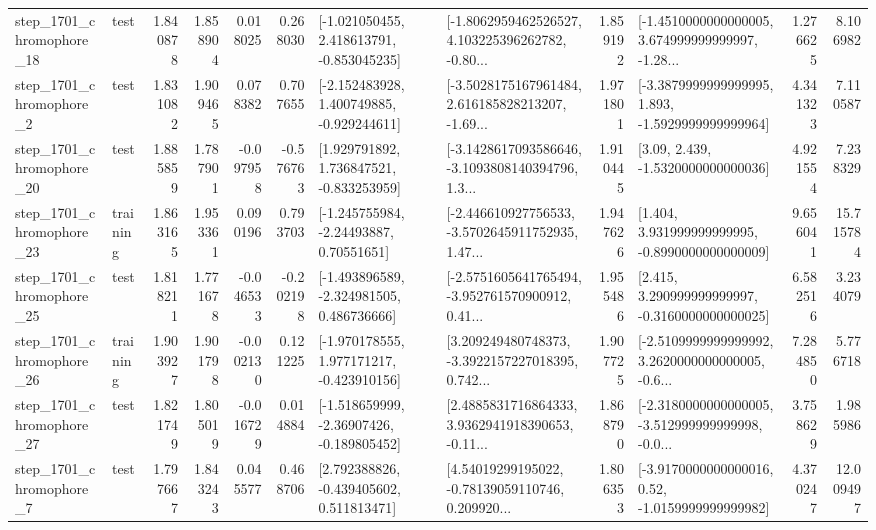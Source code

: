 \begin{tabular}{llrrrrllrlrr}
 step\_1701\_chromophore\_18 &      test &      1.840878 &    1.858904 &      0.018025 &  0.268030 &   [-1.021050455, 2.418613791, -0.853045235] &  [-1.8062959462526527, 4.103225396262782, -0.80... &       1.859192 &  [-1.4510000000000005, 3.674999999999997, -1.28... &            1.276625 &          8.106982 \\
  step\_1701\_chromophore\_2 &      test &      1.831082 &    1.909465 &      0.078382 &  0.707655 &   [-2.152483928, 1.400749885, -0.929244611] &  [-3.5028175167961484, 2.616185828213207, -1.69... &       1.971801 &  [-3.3879999999999995, 1.893, -1.5929999999999964] &            4.341323 &          7.110587 \\
 step\_1701\_chromophore\_20 &      test &      1.885859 &    1.787901 &     -0.097958 & -0.576763 &    [1.929791892, 1.736847521, -0.833253959] &  [-3.1428617093586646, -3.1093808140394796, 1.3... &       1.910445 &                 [3.09, 2.439, -1.5320000000000036] &            4.921554 &          7.238329 \\
 step\_1701\_chromophore\_23 &  training &      1.863165 &    1.953361 &      0.090196 &  0.793703 &     [-1.245755984, -2.24493887, 0.70551651] &  [-2.446610927756533, -3.5702645911752935, 1.47... &       1.947626 &    [1.404, 3.931999999999995, -0.8990000000000009] &            9.656041 &         15.715784 \\
 step\_1701\_chromophore\_25 &      test &      1.818211 &    1.771678 &     -0.046533 & -0.202198 &   [-1.493896589, -2.324981505, 0.486736666] &  [-2.5751605641765494, -3.952761570900912, 0.41... &       1.955486 &    [2.415, 3.290999999999997, -0.3160000000000025] &            6.582516 &          3.234079 \\
 step\_1701\_chromophore\_26 &  training &      1.903927 &    1.901798 &     -0.002130 &  0.121225 &   [-1.970178555, 1.977171217, -0.423910156] &  [3.209249480748373, -3.3922157227018395, 0.742... &       1.907725 &  [-2.5109999999999992, 3.2620000000000005, -0.6... &            7.284850 &          5.776718 \\
 step\_1701\_chromophore\_27 &      test &      1.821749 &    1.805019 &     -0.016729 &  0.014884 &   [-1.518659999, -2.36907426, -0.189805452] &  [2.4885831716864333, 3.9362941918390653, -0.11... &       1.868790 &  [-2.3180000000000005, -3.512999999999998, -0.0... &            3.758629 &          1.985986 \\
  step\_1701\_chromophore\_7 &      test &      1.797667 &    1.843243 &      0.045577 &  0.468706 &    [2.792388826, -0.439405602, 0.511813471] &  [4.54019299195022, -0.78139059110746, 0.209920... &       1.806353 &   [-3.9170000000000016, 0.52, -1.0159999999999982] &            4.370247 &         12.009497 \\

\end{tabular}
